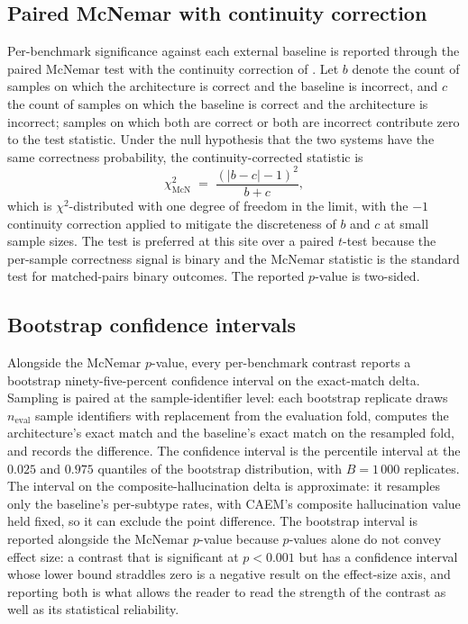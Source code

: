 \subsection{Paired McNemar with continuity correction}
\label{sec:sig-mcnemar}

Per-benchmark significance against each external baseline is reported through the paired McNemar test with the continuity correction of \cite{edwards1948note}. Let $b$ denote the count of samples on which the architecture is correct and the baseline is incorrect, and $c$ the count of samples on which the baseline is correct and the architecture is incorrect; samples on which both are correct or both are incorrect contribute zero to the test statistic. Under the null hypothesis that the two systems have the same correctness probability, the continuity-corrected statistic is
\begin{equation}
\chi^{2}_{\text{McN}} \;=\; \frac{(|b - c| - 1)^{2}}{b + c},
\label{eq:mcnemar}
\end{equation}
which is $\chi^{2}$-distributed with one degree of freedom in the limit, with the $-1$ continuity correction applied to mitigate the discreteness of $b$ and $c$ at small sample sizes. The test is preferred at this site over a paired $t$-test because the per-sample correctness signal is binary and the McNemar statistic is the standard test for matched-pairs binary outcomes. The reported $p$-value is two-sided.

\subsection{Bootstrap confidence intervals}
\label{sec:sig-bootstrap}

Alongside the McNemar $p$-value, every per-benchmark contrast reports a bootstrap ninety-five-percent confidence interval on the exact-match delta. Sampling is paired at the sample-identifier level: each bootstrap replicate draws $n_{\text{eval}}$ sample identifiers with replacement from the evaluation fold, computes the architecture's exact match and the baseline's exact match on the resampled fold, and records the difference. The confidence interval is the percentile interval at the $0.025$ and $0.975$ quantiles of the bootstrap distribution, with $B = 1\,000$ replicates. The interval on the composite-hallucination delta is approximate: it resamples only the baseline's per-subtype rates, with CAEM's composite hallucination value held fixed, so it can exclude the point difference. The bootstrap interval is reported alongside the McNemar $p$-value because $p$-values alone do not convey effect size: a contrast that is significant at $p < 0.001$ but has a confidence interval whose lower bound straddles zero is a negative result on the effect-size axis, and reporting both is what allows the reader to read the strength of the contrast as well as its statistical reliability.

